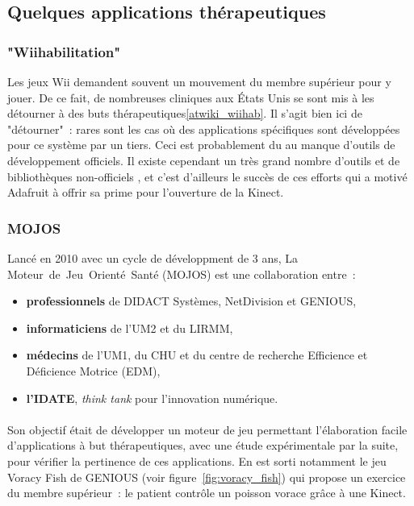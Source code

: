 
\subsection{Quelques applications thérapeutiques}

\subsubsection{"Wiihabilitation"}

Les jeux Wii demandent souvent un mouvement du membre supérieur pour y 
jouer. De ce fait, de nombreuses 
cliniques aux États Unis se sont mis à les détourner à des buts 
thérapeutiques\ref{atwiki_wiihab}. Il s'agit bien ici de "détourner"~: rares sont les cas où des
applications spécifiques sont développées pour ce système par un tiers. Ceci
est probablement du au manque d'outils de développement officiels. Il existe
cependant un très grand nombre d'outils et de bibliothèques non-officiels
\cite{homebrew_wii}, et
c'est d'ailleurs le succès de ces efforts qui a motivé Adafruit à offrir sa prime
pour l'ouverture de la Kinect.

\subsubsection{MOJOS}
Lancé en 2010 avec un cycle de développment de 3 ans, 
La Moteur~de~Jeu~Orienté~Santé (MOJOS) est une collaboration entre~:
\begin{itemize}
\item \textbf{professionnels} de DIDACT Systèmes, NetDivision et GENIOUS,
\item \textbf{informaticiens} de l'UM2 et du LIRMM,
\item \textbf{médecins} de l'UM1, du CHU et du centre 
de recherche Efficience et Déficience Motrice (EDM),
\item \textbf{l'IDATE}, \emph{think tank} pour l'innovation numérique.
\end{itemize}\cite{mojos}

\paragraph{}
Son objectif était de développer un moteur de jeu permettant 
l'élaboration facile d'applications à but thérapeutiques, avec une étude 
expérimentale
par la suite, pour vérifier la pertinence de ces applications. En est sorti 
notamment le jeu Voracy Fish de GENIOUS (voir figure~\ref{fig:voracy_fish})
qui propose un exercice du membre supérieur~: le patient contrôle un poisson 
vorace grâce à une Kinect.

